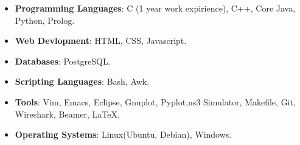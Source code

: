 \begin{multicols}{2}
\begin{itemize}
  \item \textbf{Programming Languages}: C (1 year work expirience), C++, Core Java, Python, Prolog.\\[-0.6cm]
 
  \item \textbf{Web Devlopment}: HTML, CSS, Javascript. 
  \item \textbf{Databases}: PostgreSQL.\\[-0.6cm]
\end{itemize}
\columnbreak
\begin{itemize}
 \item \textbf{Scripting Languages}: Bash, Awk. \\[-0.6cm]
  \item \textbf{Tools}: Vim, Emacs, Eclipse, Gnuplot, Pyplot,ns3 Simulator, Makefile, Git, Wireshark, Beamer, \LaTeX.\\[-0.6cm]
  \item \textbf{Operating Systems}: Linux(Ubuntu, Debian), Windows.\\[-0.6cm]
\end{itemize}
\end{multicols}

